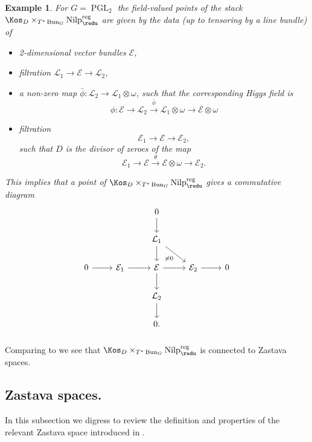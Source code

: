 \documentclass[9pt]{amsart}
\DeclareMathOperator{\reg}{{reg}}
\newcommand{\cE}{{\mathcal E}}
\newcommand{\cL}{{\mathcal L}}
\DeclareMathOperator{\Nilp}{{Nilp}} \DeclareMathOperator{\op}{{op}}
\DeclareMathOperator{\PGL}{{PGL}}
\newtheorem{ex}[subsubsection]{Example}
\numberwithin{equation}{section}
\begin{document}
\begin{ex}
	For $G=\PGL_2$ the field-valued points of the stack $\Kos_D \times_{T^* \Bun_G} \Nilp^{\reg}_{\redu}$ are given by the data (up to tensoring by a line bundle) of
	\begin{itemize}
		\item 2-dimensional vector bundles $\cE$,
		\item filtration $\cL_1 \rightarrow \cE \rightarrow \cL_2$,
		\item a non-zero map $\bar{\phi}: \cL_2 \rightarrow \cL_1 \otimes \omega$, such that the corresponding Higgs field is 
		$$\phi: \cE \rightarrow \cL_2 \xrightarrow{\bar{\phi}} \cL_1 \otimes \omega \rightarrow \cE \otimes \omega$$
		\item filtration $$\cE_1\rightarrow \cE \rightarrow\cE_2,$$such that $D$ is the divisor of zeroes of the map 
		$$\cE_1 \rightarrow \cE \xrightarrow{\theta} \cE\otimes \omega \rightarrow \cE_2.$$
	\end{itemize}
	This implies that a point of $\Kos_D \times_{T^* \Bun_G} \Nilp^{\reg}_{\redu}$ gives a commutative diagram 
		\[
	\begin{tikzcd}
	&   & 0\ar[d, rightarrow, ""']& & \\
	&   & \cL_1 \ar[d, rightarrow, ""']\ar[dr, rightarrow, "\neq 0"']& &  \\
	0\ar[r, rightarrow, ""']&   \cE_1 \ar[r, rightarrow, ""']  & \cE \ar[r, rightarrow, ""']\ar[d, rightarrow, ""']& \cE_2\ar[r, rightarrow, ""']& 0\\
	&   & \cL_2\ar[d, rightarrow, ""']& & \\
	&   & 0.& & 
	\end{tikzcd}
	\]
\end{ex}

\subsubsection{} 	Comparing to \cite[Example 2.11.2] {CPSI} we see that $\Kos_D \times_{T^* \Bun_G} \Nilp^{\reg}_{\redu}$ is connected to Zastava spaces. 

\subsection{Zastava spaces.}
In this subsection we digress to review the definition and properties of the relevant Zastava space introduced in \cite{BFGM}.
\end{document}
